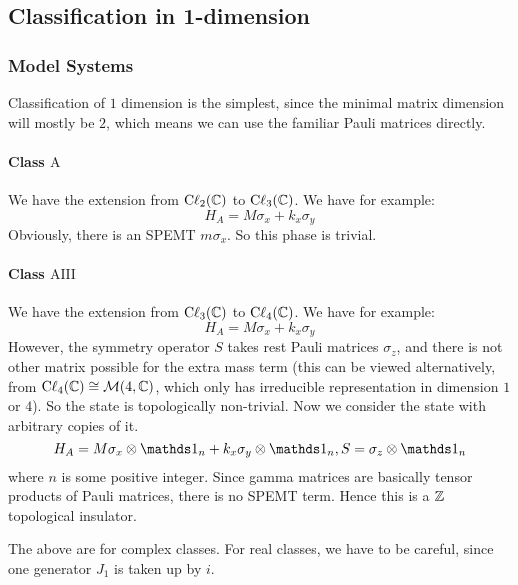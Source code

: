 \subsection{Classification in 1-dimension}
\label{sec:Classification in 1-dimension}

\subsubsection{Model Systems}
\label{sec:Model Systems}
Classification of $1$ dimension is the simplest, since the minimal matrix
dimension will mostly be $2$, which means we can use the familiar Pauli matrices
directly.

\paragraph{Class $\mathrm{A}$} We have the extension from
$\mathrm{C\ell}_{2}(\mathbb{C})$ to $\mathrm{C\ell}_{3}(\mathbb{C})$. We have for example:
\begin{equation}
    H_A = M \sigma_x + k_x \sigma_y
\end{equation}
Obviously, there is an SPEMT $m\sigma_x$. So this phase is trivial.

\paragraph{Class $\mathrm{AIII}$} We have the extension from
$\mathrm{C\ell}_{3}(\mathbb{C})$ to $\mathrm{C\ell}_{4}(\mathbb{C})$. We have
for example:
\begin{equation}
    H_A = M \sigma_x + k_x \sigma_y
\end{equation}
However, the symmetry operator $S$ takes rest Pauli matrices $\sigma_z$, and
there is not other matrix possible for the extra mass term (this can be viewed
alternatively, from $\mathrm{C\ell}_{4}(\mathbb{C})\cong \mathcal{M}(4,\mathbb{C})$, which only
has irreducible representation in dimension $1$ or $4$). So the state is
topologically non-trivial. Now we consider the state with arbitrary copies of it.
\begin{equation}
    H_A = M \sigma_x\otimes \id_n + k_x\sigma_y\otimes\id_n,
    S=\sigma_z\otimes\id_n
\end{equation}
where $n$ is some positive integer. Since gamma matrices are basically tensor
products of Pauli matrices, there is no SPEMT term. Hence this is a $\mathbb{Z}$
topological insulator.

The above are for complex classes. For real classes, we have to be careful,
since one generator $J_1$ is taken up by $i$.

